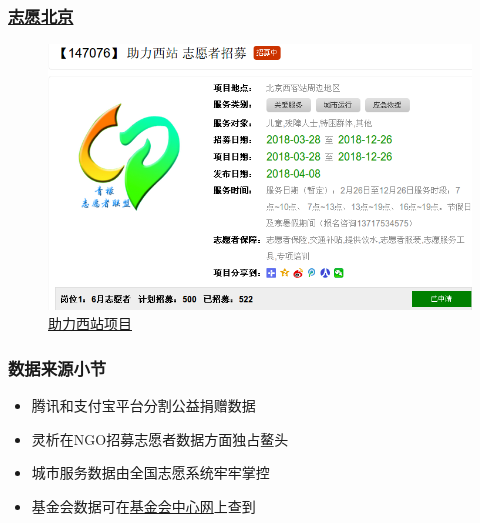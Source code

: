 \documentclass{ctexbeamer}
\begin{document}
\begin{frame}
\frametitle{\href{http://www.bv2008.cn}{志愿北京}}
\begin{figure}
\includegraphics[width=\textwidth]{data3.png}
\caption{\href{http://www.bv2008.cn/app/opp/view.php?id=147076}{助力西站项目}}
\end{figure}

\end{frame}
\begin{frame}
\frametitle{数据来源小节}
\begin{itemize}
\item 腾讯和支付宝平台分割公益捐赠数据
\item 灵析在NGO招募志愿者数据方面独占鳌头
\item 城市服务数据由全国志愿系统牢牢掌控
\item 基金会数据可在\href{http://www.foundationcenter.org.cn/}{基金会中心网}上查到
\end{itemize}
\end{frame}
\end{document}

